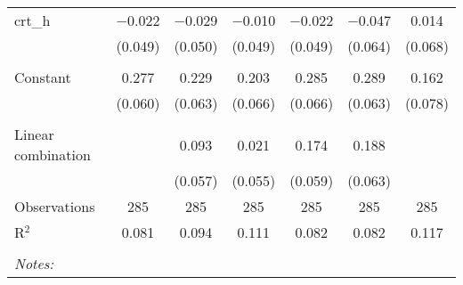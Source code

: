 \begin{table}[!htbp]
\begin{tabular}{@{\extracolsep{5pt}}lcccccc}
 crt\_h & $-$0.022 & $-$0.029 & $-$0.010 & $-$0.022 & $-$0.047 & 0.014 \\ 
  & (0.049) & (0.050) & (0.049) & (0.049) & (0.064) & (0.068) \\ 
  & & & & & & \\ 
 Constant & 0.277 & 0.229 & 0.203 & 0.285 & 0.289 & 0.162 \\ 
  & (0.060) & (0.063) & (0.066) & (0.066) & (0.063) & (0.078) \\ 
  & & & & & & \\ 
Linear combination &   & 0.093 & 0.021 & 0.174 & 0.188 &  \\ 
 &  & (0.057) & (0.055) & (0.059) & (0.063) &  \\ 
Observations & 285 & 285 & 285 & 285 & 285 & 285 \\ 
R$^{2}$ & 0.081 & 0.094 & 0.111 & 0.082 & 0.082 & 0.117 \\ 
\hline \\[-1.8ex] 
\textit{Notes:} & \multicolumn{6}{l}{} \\ 
\end{tabular} 
\end{table} 
